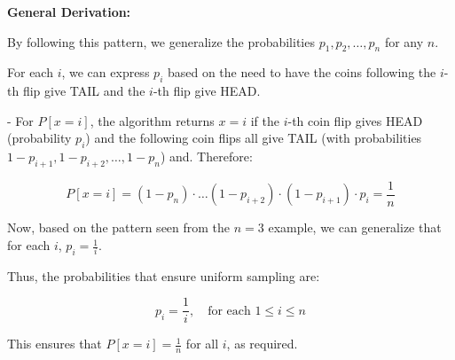 \documentclass{article}
\begin{document}
\textbf{General Derivation:}

By following this pattern, we generalize the probabilities \( p_1, p_2, \dots, p_n \) for any \( n \).

For each \( i \), we can express \( p_i \) based on the need to have the coins following the \(i\)-th flip give TAIL and the \( i \)-th flip give HEAD. 

- For \( P[x = i] \), the algorithm returns \( x = i \) if the \( i \)-th coin flip gives HEAD (probability \( p_i \)) and the following coin flips all give TAIL (with probabilities \( 1 - p_{i+1}, 1 - p_{i+2}, \dots, 1 - p_n \)) and. Therefore:

\[
P[x = i] = (1 - p_n) \cdot \dots (1 - p_{i+2}) \cdot (1 - p_{i+1}) \cdot p_i = \frac{1}{n}
\]

Now, based on the pattern seen from the \( n = 3 \) example, we can generalize that for each \( i \), \( p_i = \frac{1}{i} \).

Thus, the probabilities that ensure uniform sampling are:

\[
p_i = \frac{1}{i}, \quad \text{for each } 1 \leq i \leq n
\]

This ensures that \( P[x = i] = \frac{1}{n} \) for all \( i \), as required.
\end{document}
